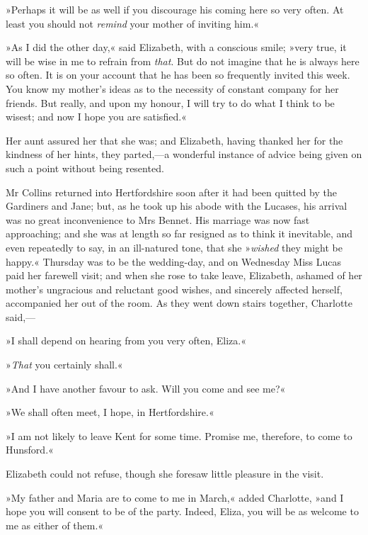 »Perhaps it will be as well if you discourage his coming here so very often. At least you should not \textit{remind} your mother of inviting him.«

»As I did the other day,« said Elizabeth, with a conscious smile; »very true, it will be wise in me to refrain from \textit{that}. But do not imagine that he is always here so often. It is on your account that he has been so frequently invited this week. You know my mother's ideas as to the necessity of constant company for her friends. But really, and upon my honour, I will try to do what I think to be wisest; and now I hope you are satisfied.«

Her aunt assured her that she was; and Elizabeth, having thanked her for the kindness of her hints, they parted,—a wonderful instance of advice being given on such a point without being resented.

Mr Collins returned into Hertfordshire soon after it had been quitted by the Gardiners and Jane; but, as he took up his abode with the Lucases, his arrival was no great inconvenience to Mrs Bennet. His marriage was now fast approaching; and she was at length so far resigned as to think it inevitable, and even repeatedly to say, in an ill-natured tone, that she »\textit{wished} they might be happy.« Thursday was to be the wedding-day, and on Wednesday Miss Lucas paid her farewell visit; and when she rose to take leave, Elizabeth, ashamed of her mother's ungracious and reluctant good wishes, and sincerely affected herself, accompanied her out of the room. As they went down stairs together, Charlotte said,—

»I shall depend on hearing from you very often, Eliza.«

»\textit{That} you certainly shall.«

»And I have another favour to ask. Will you come and see me?«

»We shall often meet, I hope, in Hertfordshire.«

»I am not likely to leave Kent for some time. Promise me, therefore, to come to Hunsford.«

Elizabeth could not refuse, though she foresaw little pleasure in the visit.

»My father and Maria are to come to me in March,« added Charlotte, »and I hope you will consent to be of the party. Indeed, Eliza, you will be as welcome to me as either of them.«

